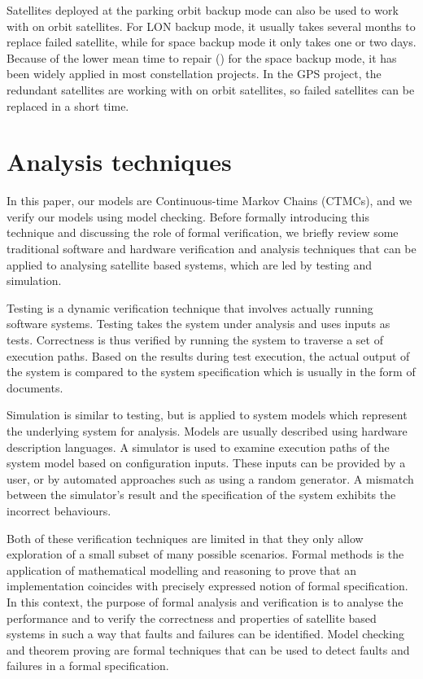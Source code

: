 \documentclass[preprint,12pt]{qrei}
\begin{document}
Satellites deployed at the parking orbit backup mode can also be used to work with on orbit satellites. For LON backup mode, it usually takes several months to replace failed satellite, while for space backup mode it only takes one or two days. Because of the lower mean time to repair () for the space backup mode, it has been widely applied in most constellation projects. In the GPS project, the redundant satellites are working with on orbit satellites, so failed satellites can be replaced in a short time.



\section{Analysis techniques}\label{sect:formalmethods}

In this paper, our models are Continuous-time Markov Chains (CTMCs), and we verify our models using model checking. Before formally introducing this technique and discussing the role of formal verification, we briefly review some traditional software and hardware verification and analysis techniques that can be applied to analysing satellite based systems, which are led by testing and simulation.

Testing is a dynamic verification technique that involves actually running software systems. Testing takes the system under analysis and uses inputs as tests. Correctness is thus verified by running the system to traverse a set of execution paths. Based on the results during test execution, the actual output of the system is compared to the system specification which is usually in the form of documents.

Simulation is similar to testing, but is applied to system models which represent the underlying system for analysis. Models are usually described using hardware description languages. A simulator is used to examine execution paths of the system model based on configuration inputs. These inputs can be provided by a user, or by automated approaches such as using a random generator. A mismatch between the simulator's result and the specification of the system exhibits the incorrect behaviours.

Both of these verification techniques are limited in that they only allow exploration of a small subset of many possible scenarios. Formal methods is the application of mathematical modelling and reasoning to prove that an implementation coincides with precisely expressed notion of formal specification. In this context, the purpose of formal analysis and verification is to analyse the performance and to verify the correctness and properties of satellite based systems in such a way that faults and failures can be identified. Model checking and theorem proving are formal techniques that can be used to detect faults and failures in a formal specification.
\end{document}
